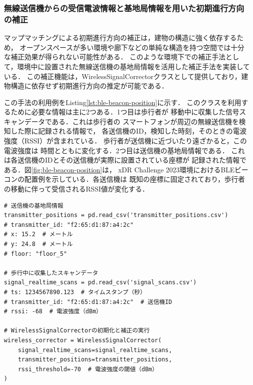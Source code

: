 
\subsubsection{無線送信機からの受信電波情報と基地局情報を用いた初期進行方向の補正}

マップマッチングによる初期進行方向の補正は，建物の構造に強く依存するため，
オープンスペースが多い環境や廊下などの単純な構造を持つ空間では十分な補正効果が得られない可能性がある．
このような環境下での補正手法として，環境中に設置された無線送信機の基地局情報を活用した補正手法を実装している．
この補正機能は，WirelessSignalCorrectorクラスとして提供しており，建物構造に依存せず初期進行方向の推定が可能である．

この手法の利用例をListing\ref{lst:ble-beacon-position}に示す．
このクラスを利用するために必要な情報は主に2つある．1つ目は歩行者が
移動中に収集した信号スキャンデータである．これは歩行者の
スマートフォンが周辺の無線送信機を検知した際に記録される情報で，
各送信機のID，検知した時刻，そのときの電波強度（RSSI）が含まれている．
歩行者が送信機に近づいたり遠ざかると，この電波強度は
時間とともに変化する．2つ目は送信機の基地局情報である．
これは各送信機のIDとその送信機が実際に設置されている座標が
記録された情報である．図\ref{fig:ble-beacon-position}は，
xDR Challenge 2023環境におけるBLEビーコンの配置例を示している．各送信機は
既知の座標に固定されており，歩行者の移動に伴って受信されるRSSI値が変化する．

\begin{lstlisting}[caption={WirelessSignalCorrectorの使用例},label=lst:ble-beacon-position,float=h]
# 送信機の基地局情報
transmitter_positions = pd.read_csv('transmitter_positions.csv')
# transmitter_id: "f2:65:d1:87:a4:2c"
# x: 15.2  # メートル
# y: 24.8  # メートル
# floor: "floor_5"

# 歩行中に収集したスキャンデータ
signal_realtime_scans = pd.read_csv('signal_scans.csv')
# ts: 1234567890.123  # タイムスタンプ（秒）
# transmitter_id: "f2:65:d1:87:a4:2c"  # 送信機ID
# rssi: -68  # 電波強度（dBm）

# WirelessSignalCorrectorの初期化と補正の実行
wireless_corrector = WirelessSignalCorrector(
    signal_realtime_scans=signal_realtime_scans,
    transmitter_positions=transmitter_positions,
    rssi_threshold=-70  # 電波強度の閾値（dBm）
)
\end{lstlisting}

